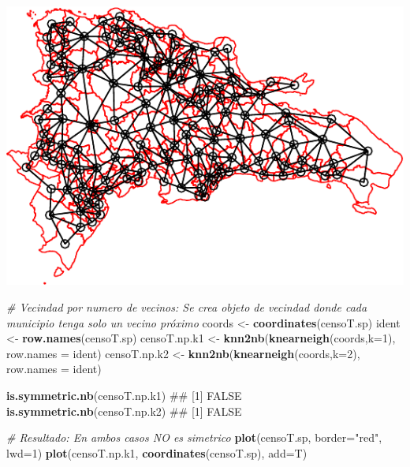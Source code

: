 \documentclass[11pt,]{article}
\newenvironment{Shaded}{\begin{snugshade}}{\end{snugshade}}
\newcommand{\KeywordTok}[1]{\textcolor[rgb]{0.13,0.29,0.53}{\textbf{#1}}}
\newcommand{\DataTypeTok}[1]{\textcolor[rgb]{0.13,0.29,0.53}{#1}}
\newcommand{\DecValTok}[1]{\textcolor[rgb]{0.00,0.00,0.81}{#1}}
\newcommand{\StringTok}[1]{\textcolor[rgb]{0.31,0.60,0.02}{#1}}
\newcommand{\CommentTok}[1]{\textcolor[rgb]{0.56,0.35,0.01}{\textit{#1}}}
\newcommand{\NormalTok}[1]{#1}
\begin{document}
\includegraphics[width=1\linewidth]{img/unnamed-chunk-4-1}

\begin{Shaded}
\begin{Highlighting}[]

\CommentTok{# Vecindad por numero de vecinos: Se crea objeto de vecindad donde cada municipio tenga solo un vecino próximo}
\NormalTok{coords <-}\StringTok{ }\KeywordTok{coordinates}\NormalTok{(censoT.sp)}
\NormalTok{ident <-}\StringTok{ }\KeywordTok{row.names}\NormalTok{(censoT.sp)}
\NormalTok{censoT.np.k1 <-}\StringTok{ }\KeywordTok{knn2nb}\NormalTok{(}\KeywordTok{knearneigh}\NormalTok{(coords,}\DataTypeTok{k=}\DecValTok{1}\NormalTok{), }\DataTypeTok{row.names =}\NormalTok{ ident)}
\NormalTok{censoT.np.k2 <-}\StringTok{ }\KeywordTok{knn2nb}\NormalTok{(}\KeywordTok{knearneigh}\NormalTok{(coords,}\DataTypeTok{k=}\DecValTok{2}\NormalTok{), }\DataTypeTok{row.names =}\NormalTok{ ident)}

\KeywordTok{is.symmetric.nb}\NormalTok{(censoT.np.k1)}
\NormalTok{## [1] FALSE}
\KeywordTok{is.symmetric.nb}\NormalTok{(censoT.np.k2)}
\NormalTok{## [1] FALSE}

\CommentTok{# Resultado: En ambos casos NO es simetrico}
\KeywordTok{plot}\NormalTok{(censoT.sp, }\DataTypeTok{border=}\StringTok{"red"}\NormalTok{, }\DataTypeTok{lwd=}\DecValTok{1}\NormalTok{)}
\KeywordTok{plot}\NormalTok{(censoT.np.k1, }\KeywordTok{coordinates}\NormalTok{(censoT.sp), }\DataTypeTok{add=}\NormalTok{T)}
\end{Highlighting}
\end{Shaded}
\end{document}
